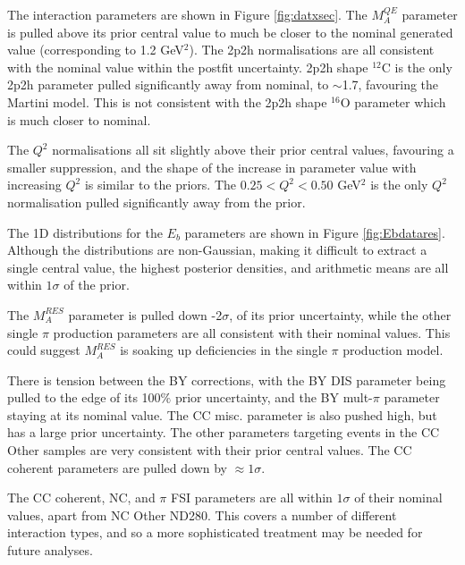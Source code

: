 The interaction parameters are shown in Figure \ref{fig:datxsec}. The $M^{QE}_A$ parameter is pulled above its prior central value to much be closer to the nominal generated value (corresponding to 1.2 GeV$^2$). The 2p2h normalisations are all consistent with the nominal value within the postfit uncertainty. 2p2h shape $^{12}$C is the only 2p2h parameter pulled significantly away from nominal, to $\sim$1.7, favouring the Martini model. This is not consistent with the 2p2h shape $^{16}$O parameter which is much closer to nominal.

The $Q^2$ normalisations all sit slightly above their prior central values, favouring a smaller suppression, and the shape of the increase in parameter value with increasing $Q^2$ is similar to the priors. The $0.25 < Q^2< 0.50$ GeV$^2$ is the only $Q^2$ normalisation pulled significantly away from the prior.

The 1D distributions for the $E_b$ parameters are shown in Figure \ref{fig:Ebdatares}. Although the distributions are non-Gaussian, making it difficult to extract a single central value, the highest posterior densities, and arithmetic means are all within $1\sigma$ of the prior.

The $M_A^{RES}$ parameter is pulled down -2$\sigma$, of its prior uncertainty, while the other single $\pi$ production parameters are all consistent with their nominal values. This could suggest $M_A^{RES}$ is soaking up deficiencies in the single $\pi$ production model.

There is tension between the BY corrections, with the BY DIS parameter being pulled to the edge of its 100$\%$ prior uncertainty, and the BY mult-$\pi$ parameter staying at its nominal value. The CC misc. parameter is also pushed high, but has a large prior uncertainty. The other parameters targeting events in the CC Other samples are very consistent with their prior central values. The CC coherent parameters are pulled down by $\approx 1\sigma$.

The CC coherent, NC, and $\pi$ FSI parameters are all within $1\sigma$ of their nominal values, apart from NC Other ND280. This covers a number of different interaction types, and so a more sophisticated treatment may be needed for future analyses. 

